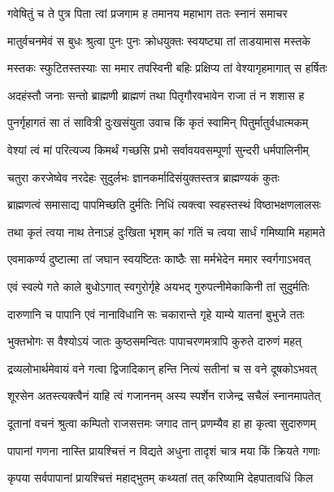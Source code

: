 \twolineshloka
{गवेषितुं च ते पुत्र पिता त्वां प्रजगाम ह}
{तमानय महाभाग ततः स्नानं समाचर} %

\twolineshloka
{मातुर्वचनमेवं स बुधः श्रुत्वा पुनः पुनः}
{क्रोधयुक्तः स्वयष्ट्या तां ताडयामास मस्तके} %

\twolineshloka
{मस्तकः स्फुटितस्तस्याः सा ममार तपस्विनी}
{बहिः प्रक्षिप्य तां वेश्यागृहमागात् स हर्षितः} %

\twolineshloka
{अदहंस्तौ जनाः सन्तो ब्राह्मणी ब्राह्मणं तथा}
{पितृगौरवभावेन राजा तं न शशास ह} %

\twolineshloka
{पुनर्गृहागतं सा तं सावित्री दुःखसंयुता}
{उवाच किं कृतं स्वामिन् पितुर्मातुर्वधात्मकम्} %

\twolineshloka
{वेश्यां त्वं मां परित्यज्य किमर्थं गच्छसि प्रभो}
{सर्वावयवसम्पूर्णा सुन्दरी धर्मपालिनीम्} %

\twolineshloka
{चतुरा करजेष्वेव नरदेहः सुदुर्लभः}
{ज्ञानकर्मादिसंयुक्तस्तत्र ब्राह्मण्यकं कुतः} %

\twolineshloka
{ब्राह्मणत्वं समासाद्य पापमिच्छति दुर्मतिः}
{निधिं त्यक्त्वा स्वहस्तस्थं विष्ठाभक्षणलालसः} %

\twolineshloka
{तथा कृतं त्वया नाथ तेनाऽहं दुःखिता भृशम्}
{कां गतिं च त्वया सार्धं गमिष्यामि महामते} %

\twolineshloka
{एवमाकर्ण्य दुष्टात्मा तां जघान स्वयष्टितः}
{काष्ठैः सा मर्मभेदेन ममार स्वर्गगाऽभवत्} %

\twolineshloka
{एवं स्वल्पे गते काले बुधोऽगात् स्वगुरोर्गृहे}
{अयभद् गुरुपत्नीमेकाकिनी तां सुदुर्मतिः} %

\twolineshloka
{दारुणानि च पापानि एवं नानाविधानि सः}
{चकारान्ते गृहे याम्ये यातनां बुभुजे ततः} %

\twolineshloka
{भुक्तभोगः स वैश्योऽयं जातः कुष्ठसमन्वितः}
{पापाचरणमत्रापि कुरुते दारुणं महत्} %

\twolineshloka
{द्रव्यलोभार्थमेवायं वने गत्वा द्विजादिकान्}
{हन्ति नित्यं सतीनां च स वने दूषकोऽभवत्} %

\twolineshloka
{शूरसेन अतस्त्यक्त्वैनं याहि त्वं गजाननम्}
{अस्य स्पर्शेन राजेन्द्र सचैलं स्नानमापतेत्} %

\twolineshloka
{दूतानां वचनं श्रुत्वा कम्पितो राजसत्तमः}
{जगाद तान् प्रणम्यैव हा हा कृत्वा सुदारुणम्} %


\twolineshloka
{पापानां गणना नास्ति प्रायश्चित्तं न विद्यते}
{अधुना तादृशं चात्र मया किं क्रियते गणाः} %

\twolineshloka
{कृपया सर्वपापानां प्रायश्चित्तं महाद्भुतम्}
{कथ्यतां तत् करिष्यामि देहपातावधिं किल} %

